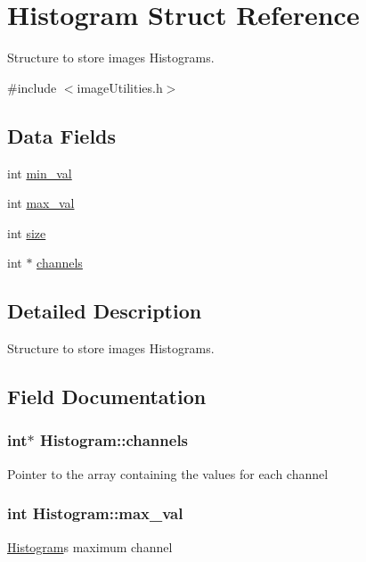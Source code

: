\hypertarget{struct_histogram}{}\section{Histogram Struct Reference}
\label{struct_histogram}


Structure to store images Histograms.  




{\ttfamily \#include $<$image\+Utilities.\+h$>$}

\subsection*{Data Fields}
\begin{DoxyCompactItemize}
\item 
int \hyperlink{struct_histogram_aa635d0511d4e0266b109618ffb261194}{min\+\_\+val}
\item 
int \hyperlink{struct_histogram_af898f1a29579cf3888613b56e1ab488d}{max\+\_\+val}
\item 
int \hyperlink{struct_histogram_a9739df0cd7655cb1bbfb4313a499b851}{size}
\item 
int $\ast$ \hyperlink{struct_histogram_aad65879d1e4f1c24198d2fce8f97a693}{channels}
\end{DoxyCompactItemize}


\subsection{Detailed Description}
Structure to store images Histograms. 

\subsection{Field Documentation}
\hypertarget{struct_histogram_aad65879d1e4f1c24198d2fce8f97a693}{}
\subsubsection[{channels}]{\setlength{\rightskip}{0pt plus 5cm}int$\ast$ Histogram\+::channels}\label{struct_histogram_aad65879d1e4f1c24198d2fce8f97a693}
Pointer to the array containing the values for each channel \hypertarget{struct_histogram_af898f1a29579cf3888613b56e1ab488d}{}
\subsubsection[{max\+\_\+val}]{\setlength{\rightskip}{0pt plus 5cm}int Histogram\+::max\+\_\+val}\label{struct_histogram_af898f1a29579cf3888613b56e1ab488d}
\hyperlink{struct_histogram}{Histogram}\textquotesingle{}s maximum channel \hypertarget{struct_histogram_aa635d0511d4e0266b109618ffb261194}{}
